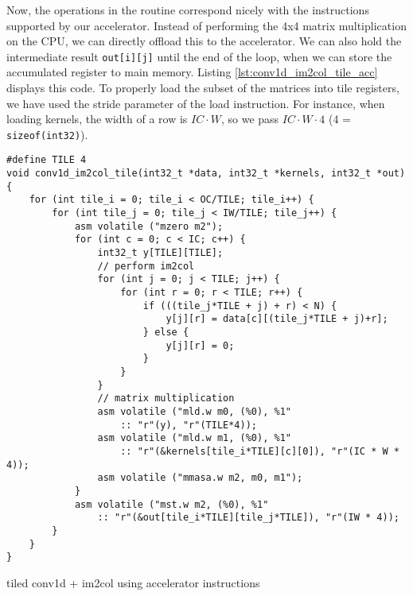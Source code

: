 \documentclass[acmsmall, nonacm=true]{acmart}
\begin{document}
Now, the operations in the routine correspond nicely with the instructions supported by our accelerator. Instead of performing the 4x4 matrix multiplication on the CPU, we can directly offload this to the accelerator. We can also hold the intermediate result \verb|out[i][j]| until the end of the loop, when we can store the accumulated register to main memory. Listing \ref{lst:conv1d_im2col_tile_acc} displays this code. To properly load the subset of the matrices into tile registers, we have used the stride parameter of the load instruction. For instance, when loading kernels, the width of a row is $IC\cdot W$, so we pass $IC\cdot W \cdot 4$ (4 = \verb|sizeof(int32)|).

\begin{listing}
    \centering
    \begin{verbatim}
#define TILE 4
void conv1d_im2col_tile(int32_t *data, int32_t *kernels, int32_t *out) {
    for (int tile_i = 0; tile_i < OC/TILE; tile_i++) {
        for (int tile_j = 0; tile_j < IW/TILE; tile_j++) {
            asm volatile ("mzero m2");
            for (int c = 0; c < IC; c++) {
                int32_t y[TILE][TILE];
                // perform im2col
                for (int j = 0; j < TILE; j++) {
                    for (int r = 0; r < TILE; r++) {
                        if (((tile_j*TILE + j) + r) < N) {
                            y[j][r] = data[c][(tile_j*TILE + j)+r];
                        } else {
                            y[j][r] = 0;
                        }                    
                    }
                }
                // matrix multiplication
                asm volatile ("mld.w m0, (%0), %1"
                    :: "r"(y), "r"(TILE*4));
                asm volatile ("mld.w m1, (%0), %1"
                    :: "r"(&kernels[tile_i*TILE][c][0]), "r"(IC * W * 4));
                asm volatile ("mmasa.w m2, m0, m1");
            }
            asm volatile ("mst.w m2, (%0), %1"
                :: "r"(&out[tile_i*TILE][tile_j*TILE]), "r"(IW * 4));
        }
    }
}
\end{verbatim}
    \caption{tiled conv1d + im2col using accelerator instructions}
    \label{lst:conv1d_im2col_tile_acc}
\end{listing}
\end{document}
